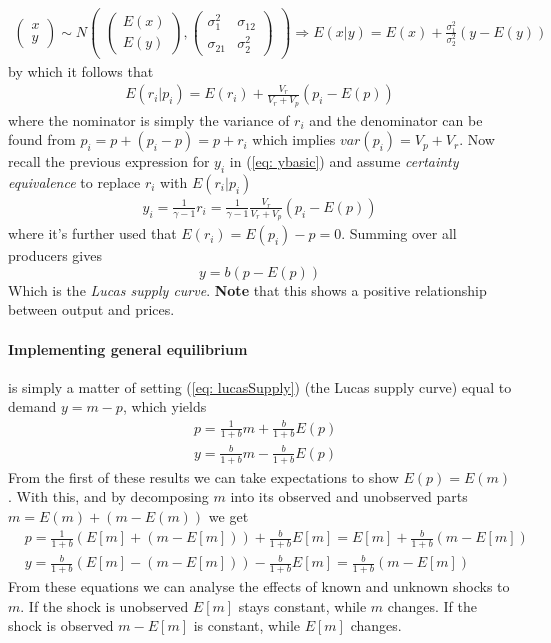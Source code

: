 \documentclass[12pt, a4paper]{article}
\begin{document}
\begin{spacing}{1.213}
\begin{align*}
\begin{pmatrix}
x \\
y
\end{pmatrix} \sim
N\begin{pmatrix}
\begin{pmatrix}
E(x) \\
E(y)
\end{pmatrix} ,
\begin{pmatrix}
\sigma^2_{1} & \sigma_{12}  \\
\sigma_{21}  & \sigma^2_{2}
\end{pmatrix}
\end{pmatrix}
\Rightarrow
E(x|y) = E(x) + \frac{\sigma_1^2}{\sigma_2^2}(y - E(y))
\end{align*}
by which it follows that
\begin{align*}
E(r_i|p_i) = E(r_i) + \frac{V_r}{V_r + V_p}(p_i - E(p))
\end{align*}
where the nominator is simply the variance of $r_i$ and the denominator can be found from $p_i = p + (p_i -p) = p+ r_i$ which implies $var(p_i) = V_p + V_r$. Now recall the previous expression for $y_i$ in (\ref{eq: ybasic}) and assume \textit{certainty equivalence} to replace $r_i$ with $E(r_i|p_i)$
\begin{align*}
y_i = \frac{1}{\gamma -1}r_i = \frac{1}{\gamma -1}\frac{V_r}{V_r + V_p} (p_i - E(p))
\end{align*}
where it's further used that $E(r_i)=E(p_i)-p = 0$. Summing over all producers gives
\begin{equation} \label{eq: lucasSupply}
y = b(p-E(p))
\end{equation}
Which is the \textit{Lucas supply curve}. \textbf{Note} that this shows a positive relationship between output and prices.

\paragraph{Implementing general equilibrium} is simply a matter of setting (\ref{eq: lucasSupply}) (the Lucas supply curve) equal to demand $y = m - p$, which yields
\begin{align*}
&p = \frac{1}{1+b}m +\frac{b}{1+b} E(p) \\
& y = \frac{b}{1+b} m - \frac{b}{1+b} E(p)
\end{align*}
From the first of these results we can take expectations to show $E(p) = E(m)$. With this, and by decomposing $m$ into its observed and unobserved parts $m = E(m) + (m-E(m))$ we get
\begin{align*}
&p = \frac{1}{1+b}(E[m] + (m-E[m] )) + \frac{b}{1+b} E[m] = E[m] + \frac{b}{1+b}(m- E[m]) \\
& y = \frac{b}{1+b} ( E[m]- (m - E[m])) - \frac{b}{1+b} E[m] = \frac{b}{1+b} (m- E[m])
\end{align*}
From these equations we can analyse the effects of known and unknown shocks to $m$. If the shock is unobserved $E[m]$ stays constant, while $m$ changes. If the shock is observed $m - E[m]$ is constant, while $E[m]$ changes.


\end{spacing}
\end{document}
